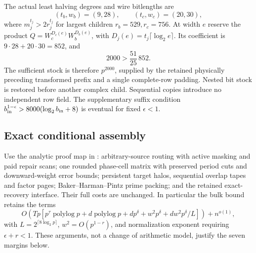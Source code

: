 \documentclass[11pt]{article}
\begin{document}
The actual least halving degrees and wire bitlengths are
\[
 (t_b,w_b)=(9,28),\qquad(t_c,w_c)=(20,30),
\]
where $m_j^{t_j}>2r_j^{t_j}$ for largest children $r_b=529,r_c=756$.
At width $e$ reserve the product
$Q=W_c^{D_c(e)}W_b^{D_b(e)}$, with
$D_j(e)=t_j\lceil\log_2e\rceil$. Its coefficient is
$9\cdot28+20\cdot30=852$, and
\[
 2000>\frac{51}{25}\,852.
\]
The sufficient stock is therefore $p^{2000}$, supplied by the retained
physically preceding transformed prefix and a single complete-row
padding. Nested bit stock is restored before another complex child.
Sequential copies introduce no independent row field. The supplementary
suffix condition $b_{\rm in}^{1-\epsilon}>8000(\log_2b_{\rm in}+8)$
is eventual for fixed $\epsilon<1$.

\subsection{Exact conditional assembly}
Use the analytic proof map in
: arbitrary-source routing
with active masking and paid repair scans; one rounded phase-cell
matrix with preserved period cuts and downward-weight error bounds;
persistent target halos, sequential overlap tapes and factor pages;
Baker--Harman--Pintz prime packing; and the retained exact-recovery
interface. Their full costs are unchanged. In particular the bulk
bound retains the terms
\[
 O\!\left(Tp\left[p^\tau\operatorname{polylog}p+
 d\operatorname{polylog}p+dp^\delta+w^2p^\delta+
 dw^2p^\delta/L\right]\right)+n^{o(1)},
\]
with $L=2^{\lceil8\log_2p\rceil}$,
$w^2=O(p^{1-r})$, and normalization exponent requiring
$\epsilon+r<1$. These arguments, not a change of arithmetic model,
justify the seven margins below.
\end{document}
